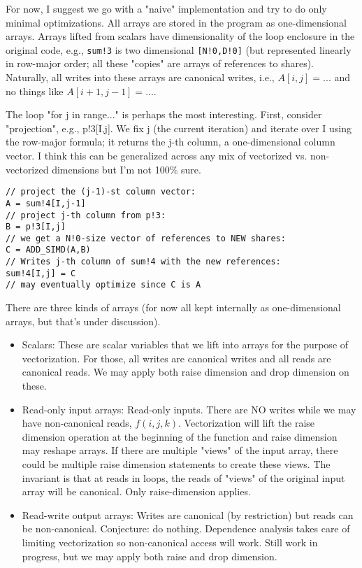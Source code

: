 
For now, I suggest we go with a "naive" implementation and try to do only minimal optimizations. 
All arrays are stored in the program as one-dimensional arrays. Arrays lifted from scalars have dimensionality of the loop enclosure in 
the original code, e.g., \texttt{sum!3} is two dimensional \texttt{[N!0,D!0]} (but represented linearly in row-major order; all these "copies" are 
arrays of references to shares). Naturally, all writes into these arrays are canonical writes, i.e., $A[i,j] = ...$ and no things like $A[i+1,j-1] = ...$.

The loop "for j in range..." is perhaps the most interesting. First, consider "projection", e.g., p!3[I,j]. 
We fix j (the current iteration) and iterate over I using the row-major formula; it returns the j-th column, 
a one-dimensional column vector. I think this can be generalized across any mix of vectorized vs. 
non-vectorized dimensions but I'm not 100\% sure.

\begin{verbatim}
// project the (j-1)-st column vector:
A = sum!4[I,j-1]
// project j-th column from p!3: 
B = p!3[I,j] 
// we get a N!0-size vector of references to NEW shares:
C = ADD_SIMD(A,B) 
// Writes j-th column of sum!4 with the new references:
sum!4[I,j] = C 
// may eventually optimize since C is A
\end{verbatim}

There are three kinds of arrays (for now all kept internally as one-dimensional arrays, but that's under discussion).
\begin{itemize}

\item Scalars: These are scalar variables that we lift into arrays for the purpose of vectorization. 
For those, all writes are canonical writes and all reads are canonical reads. We may apply both raise dimension 
and drop dimension on these.

\item Read-only input arrays: Read-only inputs. There are NO writes while we may have non-canonical reads, $f(i,j,k)$. 
Vectorization will lift the raise dimension operation at the beginning of the function and raise dimension may reshape 
arrays. If there are multiple "views" of the input array, there could be multiple raise dimension statements to create
these views. The invariant is that at reads in loops, the reads of "views" of the original input array will be canonical.
Only raise-dimension applies.
 
 \item Read-write output arrays: Writes are canonical (by restriction) but reads can be non-canonical. Conjecture:
 do nothing. Dependence analysis takes care of limiting vectorization so non-canonical access will work. 
Still work in progress, but we may apply both raise and drop dimension. 

\end{itemize}


%
